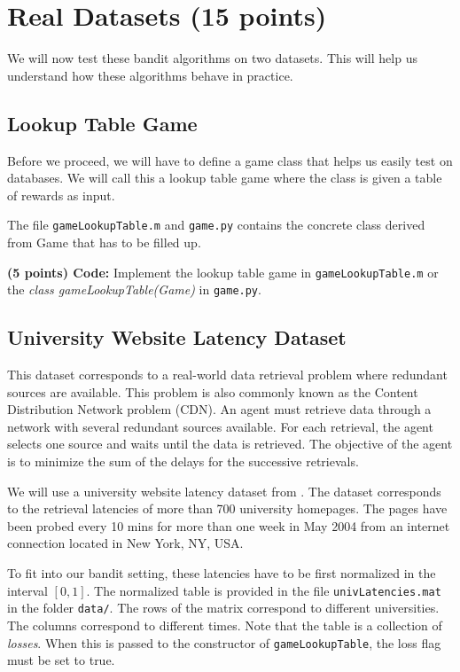 \documentclass{article}
\begin{document}

\section{Real Datasets (15 points)}

We will now test these bandit algorithms on two datasets. This will help us understand how these algorithms behave in practice.  

\subsection{Lookup Table Game}

Before we proceed, we will have to define a game class that helps us easily test on databases. We will call this a lookup table game where the class is given a table of rewards as input. 

The file \texttt{gameLookupTable.m} and \texttt{game.py} contains the concrete class derived from Game that has to be filled up. 

\noindent \textbf{(5 points) Code:} Implement the lookup table game in \texttt{gameLookupTable.m} or the \textit{class gameLookupTable(Game)} in \texttt{game.py}.

\subsection{University Website Latency Dataset}

This dataset corresponds to a real-world data retrieval problem where redundant sources are available. This problem is also commonly known as the Content Distribution Network problem (CDN). An agent must retrieve data through a network with several redundant sources available. For each retrieval, the agent selects one source and waits until the data is retrieved. The objective of the agent is to minimize the sum of the delays for the successive retrievals.

We will use a university website latency dataset from \cite{vermorel_emp2005}. The dataset  corresponds to the retrieval latencies of more than 700 university homepages. The pages have been probed every 10 mins for more than one week in May 2004 from an internet 
connection located in New York, NY, USA.

To fit into our bandit setting, these latencies have to be first normalized in the interval $[0, 1]$. The normalized table is provided in the file \texttt{univLatencies.mat} in the folder \texttt{data/}. The rows of the matrix correspond to different universities. The columns correspond to different times. Note that the table is a collection of \emph{losses}. When this is passed to the constructor of \texttt{gameLookupTable}, the loss flag must be set to true.
\end{document}
